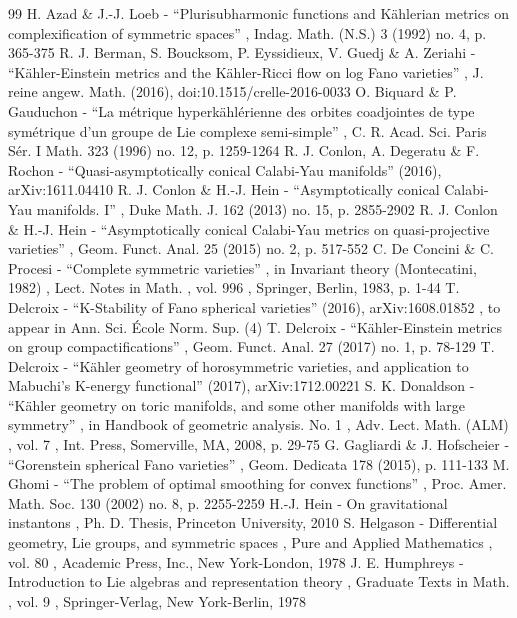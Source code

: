\begin{thebibliography}{99}
 H. Azad \& J.-J. Loeb - “Plurisubharmonic functions and Kählerian metrics on complexification of symmetric spaces” , Indag. Math. (N.S.) 3 (1992) no. 4, p. 365-375
 R. J. Berman, S. Boucksom, P. Eyssidieux, V. Guedj \& A. Zeriahi - “Kähler-Einstein metrics and the Kähler-Ricci flow on log Fano varieties” , J. reine angew. Math. (2016), doi:10.1515/crelle-2016-0033
 O. Biquard \& P. Gauduchon - “La métrique hyperkählérienne des orbites coadjointes de type symétrique d’un groupe de Lie complexe semi-simple” , C. R. Acad. Sci. Paris Sér. I Math. 323 (1996) no. 12, p. 1259-1264
 R. J. Conlon, A. Degeratu \& F. Rochon - “Quasi-asymptotically conical Calabi-Yau manifolds” (2016), arXiv:1611.04410
 R. J. Conlon \& H.-J. Hein - “Asymptotically conical Calabi-Yau manifolds. I” , Duke Math. J. 162 (2013) no. 15, p. 2855-2902
 R. J. Conlon \& H.-J. Hein - “Asymptotically conical Calabi-Yau metrics on quasi-projective varieties” , Geom. Funct. Anal. 25 (2015) no. 2, p. 517-552
 C. De Concini \& C. Procesi - “Complete symmetric varieties” , in Invariant theory (Montecatini, 1982) , Lect. Notes in Math. , vol. 996 , Springer, Berlin, 1983, p. 1-44
 T. Delcroix - “K-Stability of Fano spherical varieties” (2016), arXiv:1608.01852 , to appear in Ann. Sci. École Norm. Sup. (4)
 T. Delcroix - “Kähler-Einstein metrics on group compactifications” , Geom. Funct. Anal. 27 (2017) no. 1, p. 78-129
 T. Delcroix - “Kähler geometry of horosymmetric varieties, and application to Mabuchi’s K-energy functional” (2017), arXiv:1712.00221
 S. K. Donaldson - “Kähler geometry on toric manifolds, and some other manifolds with large symmetry” , in Handbook of geometric analysis. No. 1 , Adv. Lect. Math. (ALM) , vol. 7 , Int. Press, Somerville, MA, 2008, p. 29-75
 G. Gagliardi \& J. Hofscheier - “Gorenstein spherical Fano varieties” , Geom. Dedicata 178 (2015), p. 111-133
 M. Ghomi - “The problem of optimal smoothing for convex functions” , Proc. Amer. Math. Soc. 130 (2002) no. 8, p. 2255-2259
 H.-J. Hein - On gravitational instantons , Ph. D. Thesis, Princeton University, 2010
 S. Helgason - Differential geometry, Lie groups, and symmetric spaces , Pure and Applied Mathematics , vol. 80 , Academic Press, Inc., New York-London, 1978
 J. E. Humphreys - Introduction to Lie algebras and representation theory , Graduate Texts in Math. , vol. 9 , Springer-Verlag, New York-Berlin, 1978

\end{thebibliography}
